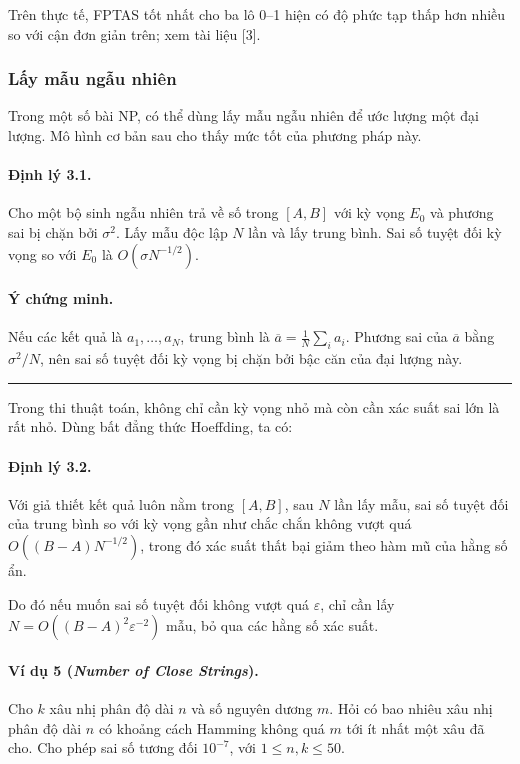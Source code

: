 \documentclass[11pt]{article}
\begin{document}
Trên thực tế, FPTAS tốt nhất cho ba lô 0--1 hiện có độ phức tạp thấp hơn nhiều
so với cận đơn giản trên; xem tài liệu [3].

\subsubsection{Lấy mẫu ngẫu nhiên}

Trong một số bài NP, có thể dùng lấy mẫu ngẫu nhiên để ước lượng một đại lượng.
Mô hình cơ bản sau cho thấy mức tốt của phương pháp này.

\paragraph{Định lý 3.1.}
Cho một bộ sinh ngẫu nhiên trả về số trong $[A,B]$ với kỳ vọng $E_0$ và phương
sai bị chặn bởi $\sigma^2$. Lấy mẫu độc lập $N$ lần và lấy trung bình. Sai số
tuyệt đối kỳ vọng so với $E_0$ là $O(\sigma N^{-1/2})$.

\paragraph{Ý chứng minh.}
Nếu các kết quả là $a_1,\ldots,a_N$, trung bình là
$\overline a=\frac1N\sum_i a_i$. Phương sai của $\overline a$ bằng
$\sigma^2/N$, nên sai số tuyệt đối kỳ vọng bị chặn bởi bậc căn của đại lượng
này. \hfill\rule{0.55em}{0.55em}

Trong thi thuật toán, không chỉ cần kỳ vọng nhỏ mà còn cần xác suất sai lớn là
rất nhỏ. Dùng bất đẳng thức Hoeffding, ta có:

\paragraph{Định lý 3.2.}
Với giả thiết kết quả luôn nằm trong $[A,B]$, sau $N$ lần lấy mẫu, sai số tuyệt
đối của trung bình so với kỳ vọng gần như chắc chắn không vượt quá
$O((B-A)N^{-1/2})$, trong đó xác suất thất bại giảm theo hàm mũ của hằng số ẩn.

Do đó nếu muốn sai số tuyệt đối không vượt quá $\varepsilon$, chỉ cần lấy
$N=O((B-A)^2\varepsilon^{-2})$ mẫu, bỏ qua các hằng số xác suất.

\paragraph{Ví dụ 5 (\emph{Number of Close Strings}).}
Cho $k$ xâu nhị phân độ dài $n$ và số nguyên dương $m$. Hỏi có bao nhiêu xâu
nhị phân độ dài $n$ có khoảng cách Hamming không quá $m$ tới ít nhất một xâu đã
cho. Cho phép sai số tương đối $10^{-7}$, với
$1\le n,k\le50$.
\end{document}

